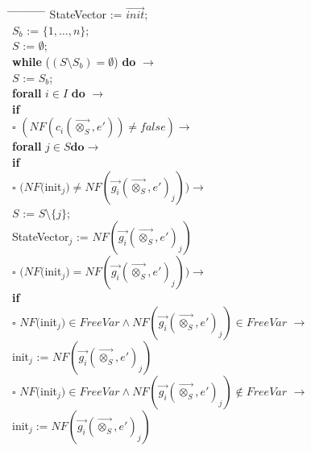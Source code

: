 \index{}\documentclass[a4paper,10pt]{article}
\theoremstyle{plain}
\theoremstyle{definition}
\newcommand{\ovr}{\overrightarrow}
\newcommand{\tb}{\textbf}
\newcommand{\ra}{$\rightarrow$}
\newcommand{\sq}{$\square$}
\begin{document}
\begin{tabbing} 
\hspace*{5.mm} \= \hspace*{5.mm} \= \hspace*{5.mm} \= \hspace*{5.mm} \= \hspace*{5.mm} \= \hspace*{5.mm}  \= \hspace*{5.mm}  \= \hspace*{5.mm}  \= \hspace*{5.mm} \= \hspace*{5.mm} \= \hspace*{5.mm}\kill
StateVector := $\ovr{init}$; \\
$S_b$ := $\lbrace 1, \ldots, n \rbrace$; \\
$S$ := $\emptyset$;\\ 
\tb{while}  ($ (S \setminus S_b) = \emptyset $) \tb{do} \ra \\
  \> $S$ := $S_b$; \\
  \> \tb{forall} $i \in I$ \tb{do} \ra \\
  \>	\>	\tb{if} \\
  \>	\>	\sq \> $(NF(c_i(\ovr{\otimes_S},e')) \not= false) \rightarrow$ \\
  \>	\>	\>  	\>  \tb{forall} $j \in S \tb{do} \rightarrow$ \\
  \>	\>	\>  	\>	\>  	    \tb{if} \\
  \>	\>	\>  	\>   	\>         $\square$  \> $(NF($init$_j) \neq NF(\ovr{g_i}(\ovr{\otimes_S}, e')_j)) \rightarrow$ \\
  \>	\>	\>  	\>    	\>       \>    \>       $S$ := $S\setminus \lbrace j \rbrace$;\\
  \> 	\>	\>	\>	\>	\>	\>	StateVector$_j$ := $NF(\ovr{g_i}(\ovr{\otimes_S}, e')_j)$\\
 \>	\>	\>  	\>    	\>        $\square$ \> $ (NF($init$_j) = NF(\ovr{g_i}(\ovr{\otimes_S}, e')_j)) \rightarrow$\\
  \>	\>	\> 	\>    	\>        \> 	\>  	\tb{if}\\
  \>	\>	\>	\>	\>	  \>	\>	\sq 	\> $NF($init$_j) \in FreeVar \wedge NF(\ovr{g_i}(\ovr{\otimes_S}, e')_j) \in FreeVar$ \ra \\
  \>	\>	\>	\>	\>	  \>	\>		\>	\>	init$_j$ := $NF(\ovr{g_i}(\ovr{\otimes_S}, e')_j)$\\ 

  \>	\>	\>	\>	\>	  \>	\>	\sq 	\> $NF($init$_j) \in FreeVar \wedge NF(\ovr{g_i}(\ovr{\otimes_S}, e')_j) \not\in FreeVar$ \ra \\
  \>	\>	\>	\>	\>	  \>	\>		\>	\>	init$_j := NF(\ovr{g_i}(\ovr{\otimes_S}, e')_j)$\\ 


\end{tabbing}
\end{document}
